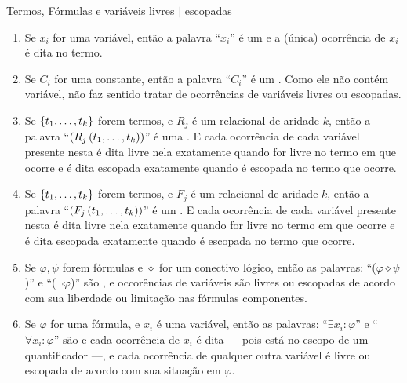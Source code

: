     \begin{definition}{Termos, Fórmulas e variáveis livres ${\vert}$ escopadas}
        \begin{enumerate}[label=(\alph*)]
            \item Se $x_i$ for uma variável, então a palavra ``$x_i$'' é um 
                 e a (única) ocorrência de $x_i$ é dita 
                 no termo.

            \item Se $C_i$ for uma constante, então a palavra ``$C_i$'' é 
                um . Como ele não contém variável, não faz 
                sentido tratar de ocorrências de variáveis livres ou escopadas.

            \item Se $\SET{t_1}{\ldots}{t_k}$ forem termos, e $R_j$ é um 
                relacional de aridade $k$, então a palavra 
                ``$(R_j\POINT{t_1}{\ldots}{t_k})$'' é uma . E 
                cada ocorrência de cada variável presente nesta é dita livre 
                nela exatamente quando for livre no termo em que ocorre e 
                é dita escopada exatamente quando é escopada no termo que 
                ocorre.
        
            \item Se $\SET{t_1}{\ldots}{t_k}$ forem termos, e $F_j$ é um 
                relacional de aridade $k$, então a palavra 
                ``$(F_j\POINT{t_1}{\ldots}{t_k})$'' é um . E 
                cada ocorrência de cada variável presente nesta é dita livre 
                nela exatamente quando for livre no termo em que ocorre e 
                é dita escopada exatamente quando é escopada no termo que 
                ocorre.

            \item Se $\varphi,\psi$ forem fórmulas e $\diamond$ for um conectivo 
                lógico, então as palavras: ``($\varphi\diamond\psi$)'' e ``($\neg\varphi$)''
                são , e occorências de variáveis são livres ou escopadas 
                de acordo com sua liberdade ou limitação nas fórmulas componentes.
            
            \item Se $\varphi$ for uma fórmula, e $x_i$ é uma variável, então as 
                palavras: ``$\exists x_i:\varphi$'' e ``$\forall x_i:\varphi$''
                são  e cada ocorrência de $x_i$ é dita 
                --- pois está no escopo de um quantificador ---,
                e cada ocorrência de qualquer outra variável é livre ou escopada 
                de acordo com sua situação em $\varphi$.


\end{enumerate}
\end{definition}
